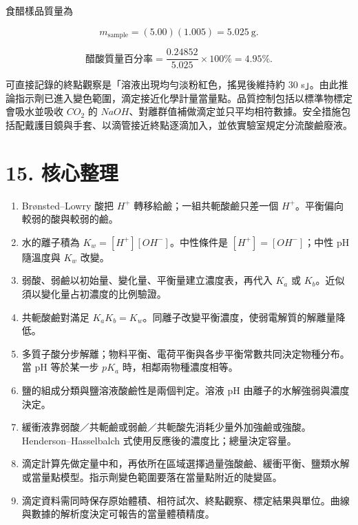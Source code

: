 \documentclass[11pt,a4paper]{article}
\providecommand{\tightlist}{%
  \setlength{\itemsep}{0pt}\setlength{\parskip}{0pt}}
\begin{document}
食醋樣品質量為

\[
m_{\mathrm{sample}}=(5.00)(1.005)=5.025\ \mathrm g.
\]

\[
\text{醋酸質量百分率}
=\frac{0.24852}{5.025}\times100\%
=4.95\%.
\]

可直接記錄的終點觀察是「溶液出現均勻淡粉紅色，搖晃後維持約 \(30\) s」。由此推論指示劑已進入變色範圍，滴定接近化學計量當量點。品質控制包括以標準物標定會吸水並吸收 \(CO_2\) 的 \(NaOH\)、對離群值補做滴定並只平均相符數據。安全措施包括配戴護目鏡與手套、以滴管接近終點逐滴加入，並依實驗室規定分流酸鹼廢液。

\section{15. 核心整理}\label{ux6838ux5fc3ux6574ux7406}

\begin{enumerate}
\def\labelenumi{\arabic{enumi}.}
\tightlist
\item
  Brønsted--Lowry 酸把 \(H^+\) 轉移給鹼；一組共軛酸鹼只差一個 \(H^+\)。平衡偏向較弱的酸與較弱的鹼。
\item
  水的離子積為 \(K_w=[H^+][OH^-]\)。中性條件是 \([H^+]=[OH^-]\)；中性 pH 隨溫度與 \(K_w\) 改變。
\item
  弱酸、弱鹼以初始量、變化量、平衡量建立濃度表，再代入 \(K_a\) 或 \(K_b\)。近似須以變化量占初濃度的比例驗證。
\item
  共軛酸鹼對滿足 \(K_aK_b=K_w\)。同離子改變平衡濃度，使弱電解質的解離量降低。
\item
  多質子酸分步解離；物料平衡、電荷平衡與各步平衡常數共同決定物種分布。當 pH 等於某一步 \(pK_a\) 時，相鄰兩物種濃度相等。
\item
  鹽的組成分類與鹽溶液酸鹼性是兩個判定。溶液 pH 由離子的水解強弱與濃度決定。
\item
  緩衝液靠弱酸／共軛鹼或弱鹼／共軛酸先消耗少量外加強鹼或強酸。Henderson--Hasselbalch 式使用反應後的濃度比；總量決定容量。
\item
  滴定計算先做定量中和，再依所在區域選擇過量強酸鹼、緩衝平衡、鹽類水解或當量點模型。指示劑變色範圍要落在當量點附近的陡變區。
\item
  滴定資料需同時保存原始體積、相符試次、終點觀察、標定結果與單位。曲線與數據的解析度決定可報告的當量體積精度。
\end{enumerate}
\end{document}
